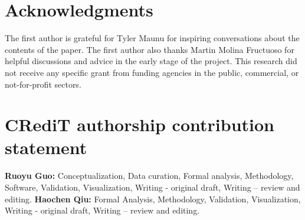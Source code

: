 \documentclass[preprint,12pt,numafflabel,authoryear]{elsarticle}
\begin{document}
\section*{Acknowledgments} 

The first author is grateful for Tyler Maunu for inspiring conversations about the contents of the paper. The first author also thanks Martin Molina Fructuoso for helpful discussions and advice in the early stage of the project. This research did not receive any specific grant from funding agencies in the public, commercial, or not-for-profit sectors.

\section*{CRediT authorship contribution statement}

\textbf{Ruoyu Guo:} Conceptualization, Data curation, Formal analysis, Methodology, Software, Validation, Visualization, Writing - original draft, Writing – review and editing. \textbf{Haochen Qiu:} Formal Analysis, Methodology, Validation, Visualization, Writing - original draft, Writing – review and editing.



\end{document}
